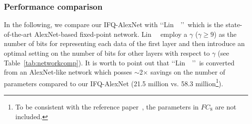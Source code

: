 \documentclass[10pt,twocolumn,letterpaper]{article}
\begin{document}
\subsubsection{Performance comparison} \label{sec:4.1.3}

In the following, we compare our IFQ-AlexNet with \lq\lq Lin~\etal~\cite{LinFixPoint}\rq\rq\, which is the state-of-the-art AlexNet-based fixed-point network. Lin~\etal~\cite{LinFixPoint} employ a $\gamma$ ($\gamma\geq 9$) as the number of bits for representing each data of the first layer and then introduce an optimal setting on the number of bits for other layers with respect to  $\gamma$ (see Table~\ref{tab:networkcomp}). It is worth to point out that \lq\lq Lin~\etal~\cite{LinFixPoint}\rq\rq\, is converted from an AlexNet-like network which posses $\sim$2$\times$ savings on the number of parameters compared to our IFQ-AlexNet (21.5 million vs. 58.3 million\footnote{To be consistent with the reference paper~\cite{LinFixPoint}, the parameters in $FC_8$ are not included.}).
\end{document}

